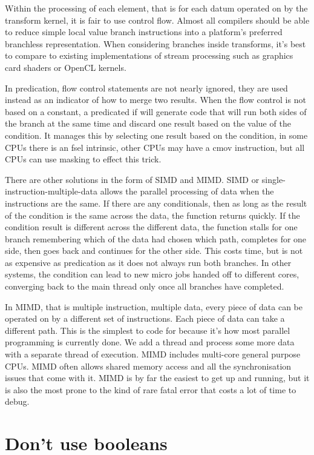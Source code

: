 Within the processing of each element, that is for each datum operated on by
the transform kernel, it is fair to use control flow. Almost all compilers
should be able to reduce simple local value branch instructions into a
platform's preferred branchless representation. When considering branches
inside transforms, it's best to compare to existing implementations of stream
processing such as graphics card shaders or OpenCL kernels.

In predication, flow control statements are not nearly ignored, they are used
instead as an indicator of how to merge two results. When the flow control is
not based on a constant, a predicated if will generate code that will run both
sides of the branch at the same time and discard one result based on the value
of the condition. It manages this by selecting one result based on the
condition, in some CPUs there is an fsel intrinsic, other CPUs may have a cmov
instruction, but all CPUs can use masking to effect this trick.

There are other solutions in the form of SIMD and MIMD. SIMD or
single-instruction-multiple-data allows the parallel processing of data when
the instructions are the same. If there are any conditionals, then as long as
the result of the condition is the same across the data, the function returns
quickly. If the condition result is different across the different data, the
function stalls for one branch remembering which of the data had chosen which
path, completes for one side, then goes back and continues for the other side.
This costs time, but is not as expensive as predication as it does not always
run both branches.  In other systems, the condition can lead to new micro jobs
handed off to different cores, converging back to the main thread only once all
branches have completed. 

In MIMD, that is multiple instruction, multiple data, every piece of data can
be operated on by a different set of instructions. Each piece of data can take
a different path. This is the simplest to code for because it's how most
parallel programming is currently done. We add a thread and process some more
data with a separate thread of execution. MIMD includes multi-core general
purpose CPUs. MIMD often allows shared memory access and all the
synchronisation issues that come with it. MIMD is by far the easiest to get up
and running, but it is also the most prone to the kind of rare fatal error that
costs a lot of time to debug.

\section{Don't use booleans}\label{sec:exist-bool}

